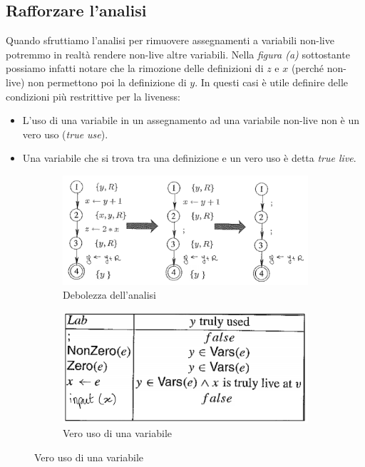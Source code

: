 \documentclass[a4paper,oneside,titlepage]{book}
\begin{document}
\subsection{Rafforzare l'analisi}
Quando sfruttiamo l'analisi per rimuovere assegnamenti a variabili non-live potremmo in realtà rendere non-live altre variabili. Nella \textit{figura (a)} sottostante possiamo infatti notare che la rimozione delle definizioni di $z$ e $x$ (perché non-live) non permettono poi la definizione di $y$. In questi casi è utile definire delle condizioni più restrittive per la liveness:
\begin{itemize}
    \item L'uso di una variabile in un assegnamento ad una variabile non-live non è un vero uso (\textit{true use}).
    \item Una variabile che si trova tra una definizione e un vero uso è detta \textit{true live}.
\end{itemize}
\begin{figure}[htp]
	\begin{subfigure}{0.49\textwidth}
	    \centering
		\includegraphics[width=\textwidth, height=\textheight, keepaspectratio]{liveness5.png}
		\caption{Debolezza dell'analisi}
	\end{subfigure}
	\hfill
	\begin{subfigure}{0.49\textwidth}
	    \centering
		\includegraphics[width=\textwidth, height=\textheight, keepaspectratio]{liveness6.png} 
		\caption{Vero uso di una variabile}
	\end{subfigure}
\end{figure}
\end{document}
